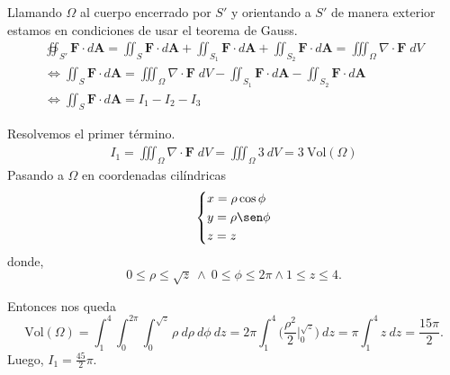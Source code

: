 \begin{solution}
  Llamando  $\Omega$  al cuerpo encerrado por $S'$ y orientando a $S'$ de manera exterior estamos en condiciones de usar el teorema de Gauss.
    \begin{gather*}
        \oiint _{S'} \mathbf{F}\cdot d\mathbf{A} =
        \iint _{S} \mathbf{F}\cdot d\mathbf{A} +
        \iint _{S_1} \mathbf{F}\cdot d\mathbf{A} +
        \iint _{S_2} \mathbf{F}\cdot d\mathbf{A} 
        =\iiint _\Omega \nabla \cdot \mathbf{F}\;dV\\[.2cm]
        \iff \iint _{S} \mathbf{F}\cdot d\mathbf{A} =
        \iiint _\Omega \nabla \cdot \mathbf{F}\;dV -
        \iint _{S_1} \mathbf{F}\cdot d\mathbf{A} -
        \iint _{S_2} \mathbf{F}\cdot d\mathbf{A}\\[.2cm]
        \iff \iint _{S} \mathbf{F}\cdot d\mathbf{A} = 
        I_1-I_2-I_3
    \end{gather*}

    Resolvemos el primer t\'ermino.
    \begin{align*}
        I_1=\iiint _\Omega \nabla \cdot \mathbf{F}\;dV = \iiint _\Omega3\:dV = 3\:\text{Vol}(\Omega)
    \end{align*}
    Pasando a  $\Omega$ en coordenadas cil\'indricas
    \[\begin{dcases}
        x=\rho \cos \phi\\
        y=\rho \sen \phi\\
        z=z
    \end{dcases}\] donde, $$0\leq\rho\leq \sqrt{z}\:\land\:0\leq\phi\leq 2\pi \land 1\leq z \leq 4.$$
    
    Entonces nos queda
    \[
   \text{Vol}(\Omega) =  \int_1^4  \int_0^{2\pi} \int_0^{\sqrt{z}}  \rho\:d\rho\:d\phi \:dz=2\pi  \int_1^4 \Big( \frac{\rho^2}{2}\Big|_0^{\sqrt{z}} \Big) \:dz =  \pi   \int_1^4   z  \:dz= \frac{15 \pi}{2}.  
    \] Luego, $I_1 =  \frac{45}{2}\pi. $




\end{solution}
